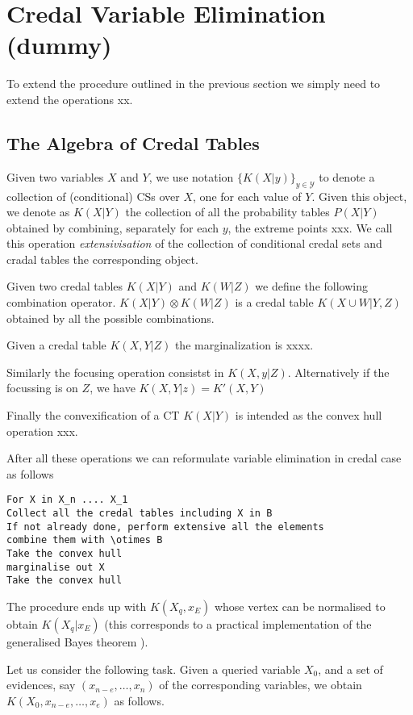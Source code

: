 \section{Credal Variable Elimination (dummy)}
To extend the procedure outlined in the previous section we simply need to extend the operations xx.

\subsection{The Algebra of Credal Tables}
Given two variables $X$ and $Y$, we use notation $\{ K(X|y) \}_{y\in\mathcal{Y}}$ to denote a collection of (conditional) CSs over $X$, one for each value of $Y$. Given this object, we denote as $K(X|Y)$ the collection of all the probability tables $P(X|Y)$ obtained by combining, separately for each $y$, the extreme points xxx. We call this operation \emph{extensivisation} of the collection of conditional credal sets and cradal tables the corresponding object.

Given two credal tables $K(X|Y)$ and $K(W|Z)$ we define the following combination operator. $K(X|Y) \otimes K(W|Z)$ is a credal table $K(X \cup W| Y,Z )$ obtained by all the possible combinations. 

Given a credal table $K(X,Y|Z)$ the marginalization is xxxx. 

Similarly the focusing operation consistst in $K(X,y|Z)$. Alternatively if the focussing is on $Z$, we have $K(X,Y|z)=K'(X,Y)$

Finally the convexification of a CT $K(X|Y)$ is intended as the convex hull operation xxx. 

After all these operations we can reformulate variable elimination in credal case as follows

\begin{verbatim}
For X in X_n .... X_1
Collect all the credal tables including X in B
If not already done, perform extensive all the elements
combine them with \otimes B
Take the convex hull
marginalise out X
Take the convex hull
\end{verbatim}
The procedure ends up with $K(X_q,x_E)$ whose vertex can be normalised to obtain $K(X_q|x_E)$ (this corresponds to a practical implementation of the generalised Bayes theorem \cite{walley}).

Let us consider the following task. Given a queried variable $X_0$, and a set of evidences, say $(x_{n-e},\ldots,x_n)$ of the corresponding variables, we obtain $K(X_0,x_{n-e},\ldots,x_e)$ as follows.

